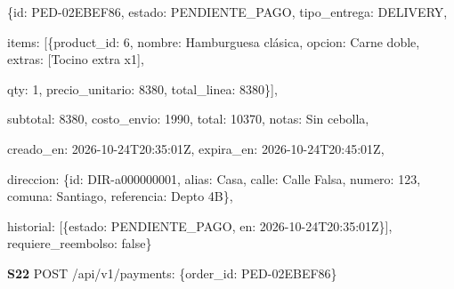 \documentclass[10pt,letterpaper]{article}
\begin{document}
{\footnotesize\ttfamily\raggedright\setlength{\parskip}{0pt}
\{\textquotedbl{}id\textquotedbl{}: \textquotedbl{}PED-02EBEF86\textquotedbl{}, \textquotedbl{}estado\textquotedbl{}: \textquotedbl{}PENDIENTE\_\allowbreak{}PAGO\textquotedbl{}, \textquotedbl{}tipo\_\allowbreak{}entrega\textquotedbl{}: \textquotedbl{}DELIVERY\textquotedbl{},\par
\textquotedbl{}items\textquotedbl{}: [\{\textquotedbl{}product\_\allowbreak{}id\textquotedbl{}: 6, \textquotedbl{}nombre\textquotedbl{}: \textquotedbl{}Hamburguesa clásica\textquotedbl{}, \textquotedbl{}opcion\textquotedbl{}: \textquotedbl{}Carne doble\textquotedbl{}, \textquotedbl{}extras\textquotedbl{}: [\textquotedbl{}Tocino extra x1\textquotedbl{}],\par
\textquotedbl{}qty\textquotedbl{}: 1, \textquotedbl{}precio\_\allowbreak{}unitario\textquotedbl{}: 8380, \textquotedbl{}total\_\allowbreak{}linea\textquotedbl{}: 8380\}],\par
\textquotedbl{}subtotal\textquotedbl{}: 8380, \textquotedbl{}costo\_\allowbreak{}envio\textquotedbl{}: 1990, \textquotedbl{}total\textquotedbl{}: 10370, \textquotedbl{}notas\textquotedbl{}: \textquotedbl{}Sin cebolla\textquotedbl{},\par
\textquotedbl{}creado\_\allowbreak{}en\textquotedbl{}: \textquotedbl{}2026-10-24T20:35:01Z\textquotedbl{}, \textquotedbl{}expira\_\allowbreak{}en\textquotedbl{}: \textquotedbl{}2026-10-24T20:45:01Z\textquotedbl{},\par
\textquotedbl{}direccion\textquotedbl{}: \{\textquotedbl{}id\textquotedbl{}: \textquotedbl{}DIR-a000000001\textquotedbl{}, \textquotedbl{}alias\textquotedbl{}: \textquotedbl{}Casa\textquotedbl{}, \textquotedbl{}calle\textquotedbl{}: \textquotedbl{}Calle Falsa\textquotedbl{}, \textquotedbl{}numero\textquotedbl{}: \textquotedbl{}123\textquotedbl{}, \textquotedbl{}comuna\textquotedbl{}: \textquotedbl{}Santiago\textquotedbl{}, \textquotedbl{}referencia\textquotedbl{}: \textquotedbl{}Depto 4B\textquotedbl{}\},\par
\textquotedbl{}historial\textquotedbl{}: [\{\textquotedbl{}estado\textquotedbl{}: \textquotedbl{}PENDIENTE\_\allowbreak{}PAGO\textquotedbl{}, \textquotedbl{}en\textquotedbl{}: \textquotedbl{}2026-10-24T20:35:01Z\textquotedbl{}\}], \textquotedbl{}requiere\_\allowbreak{}reembolso\textquotedbl{}: false\}\par}

\textbf{S22} POST /\allowbreak{}api/\allowbreak{}v1/\allowbreak{}payments: \{\textquotedbl{}order\_\allowbreak{}id\textquotedbl{}: \textquotedbl{}PED-02EBEF86\textquotedbl{}\}
\end{document}
